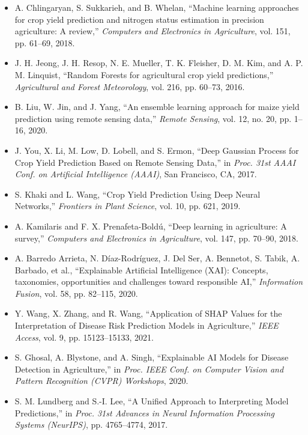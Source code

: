 \documentclass[a4paper,11pt,oneside]{book}
\begin{document}
\begin{itemize}
    \item A. Chlingaryan, S. Sukkarieh, and B. Whelan, ``Machine learning approaches for crop yield prediction and nitrogen status estimation in precision agriculture: A review,'' \emph{Computers and Electronics in Agriculture}, vol. 151, pp. 61–69, 2018.
    \item J. H. Jeong, J. H. Resop, N. E. Mueller, T. K. Fleisher, D. M. Kim, and A. P. M. Linquist, ``Random Forests for agricultural crop yield predictions,'' \emph{Agricultural and Forest Meteorology}, vol. 216, pp. 60–73, 2016.
    \item B. Liu, W. Jin, and J. Yang, ``An ensemble learning approach for maize yield prediction using remote sensing data,'' \emph{Remote Sensing}, vol. 12, no. 20, pp. 1–16, 2020.
    \item J. You, X. Li, M. Low, D. Lobell, and S. Ermon, ``Deep Gaussian Process for Crop Yield Prediction Based on Remote Sensing Data,'' in \emph{Proc. 31st AAAI Conf. on Artificial Intelligence (AAAI)}, San Francisco, CA, 2017.
    \item S. Khaki and L. Wang, ``Crop Yield Prediction Using Deep Neural Networks,'' \emph{Frontiers in Plant Science}, vol. 10, pp. 621, 2019.
    \item A. Kamilaris and F. X. Prenafeta-Boldú, ``Deep learning in agriculture: A survey,'' \emph{Computers and Electronics in Agriculture}, vol. 147, pp. 70–90, 2018.
    \item A. Barredo Arrieta, N. Díaz-Rodríguez, J. Del Ser, A. Bennetot, S. Tabik, A. Barbado, et al., ``Explainable Artificial Intelligence (XAI): Concepts, taxonomies, opportunities and challenges toward responsible AI,'' \emph{Information Fusion}, vol. 58, pp. 82–115, 2020.
    \item Y. Wang, X. Zhang, and R. Wang, ``Application of SHAP Values for the Interpretation of Disease Risk Prediction Models in Agriculture,'' \emph{IEEE Access}, vol. 9, pp. 15123–15133, 2021.
    \item S. Ghosal, A. Blystone, and A. Singh, ``Explainable AI Models for Disease Detection in Agriculture,'' in \emph{Proc. IEEE Conf. on Computer Vision and Pattern Recognition (CVPR) Workshops}, 2020.
    \item S. M. Lundberg and S.-I. Lee, ``A Unified Approach to Interpreting Model Predictions,'' in \emph{Proc. 31st Advances in Neural Information Processing Systems (NeurIPS)}, pp. 4765–4774, 2017.
\end{itemize}

\newpage
\end{document}
